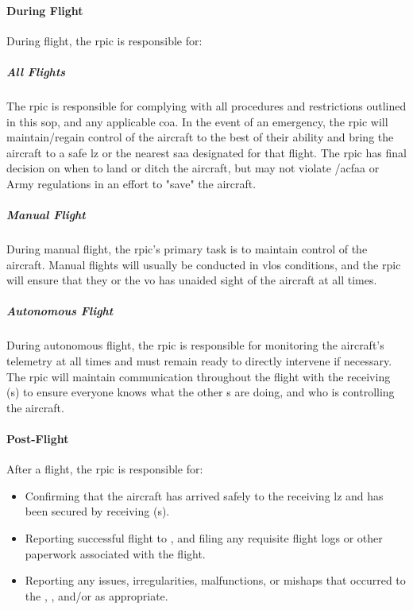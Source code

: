                 \paragraph{During Flight} During flight, the \ac{rpic} is responsible for: 

                    \subparagraph{All Flights} The \ac{rpic}  is responsible for complying with all procedures and restrictions outlined in this \ac{sop}, and any applicable \ac{coa}. In the event of an emergency, the \ac{rpic} will maintain/regain control of the aircraft to the best of their ability and bring the aircraft to a safe \ac{lz} or the nearest \ac{saa} designated for that flight. The \ac{rpic} has final decision on when to land or ditch the aircraft, but may not violate /ac{faa} or  Army regulations in an effort to "save" the aircraft. 
                    
                    \subparagraph{Manual Flight} During manual flight, the \ac{rpic}'s primary task is to maintain control of the aircraft. Manual flights will usually be conducted in \ac{vlos} conditions, and the \ac{rpic} will ensure that they or the \ac{vo} has unaided sight of the aircraft at all times. 

                    \subparagraph{Autonomous Flight} During autonomous flight, the \ac{rpic} is responsible for monitoring the aircraft's telemetry at all times and must remain ready to directly intervene if necessary. The \ac{rpic} will maintain communication throughout the flight with the receiving (s) to ensure everyone knows what the other s are doing, and who is controlling the aircraft.
                    
                \paragraph{Post-Flight} After a flight, the \ac{rpic} is responsible for: 
                
                    \begin{itemize}
                    
                        \item Confirming that the aircraft has arrived safely to the receiving \ac{lz} and has been secured by receiving (s).

                        \item Reporting successful flight to , and filing any requisite flight logs or other paperwork associated with the flight.

                        \item Reporting any issues, irregularities, malfunctions, or mishaps that occurred to the , , and/or  as appropriate. 
                        
                    \end{itemize}
                    
